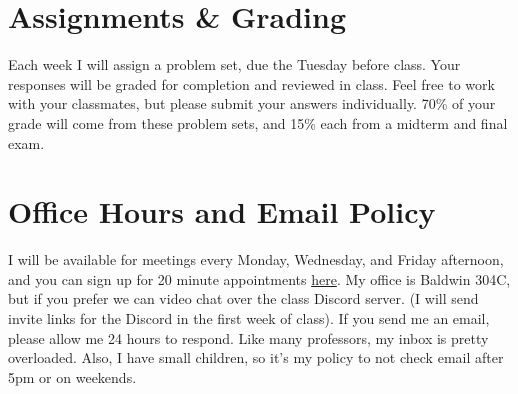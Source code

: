 \documentclass[11pt, letterpaper]{article}
\begin{document}
%
%
%
%

\section*{Assignments \& Grading}

Each week I will assign a problem set, due the Tuesday before class. Your responses will be graded for completion and reviewed in class. Feel free to work with your classmates, but please submit your answers individually. 70\% of your grade will come from these problem sets, and 15\% each from a midterm and final exam.

\section*{Office Hours and Email Policy}
I will be available for meetings every Monday, Wednesday, and Friday afternoon, and you can sign up for 20 minute appointments \href{https://calendly.com/joeornstein/20min}{here}. My office is Baldwin 304C, but if you prefer we can video chat over the class Discord server. (I will send invite links for the Discord in the first week of class). If you send me an email, please allow me 24 hours to respond. Like many professors, my inbox is pretty overloaded. Also, I have small children, so it's my policy to not check email after 5pm or on weekends. 
\end{document}
